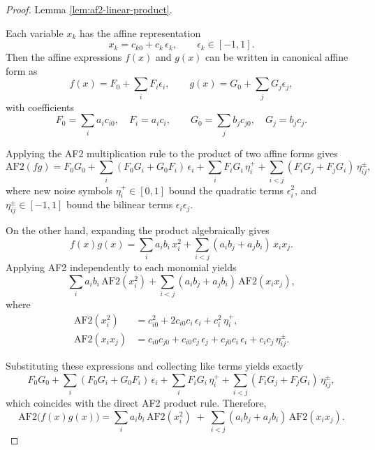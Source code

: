 \documentclass[10pt]{article}
\begin{document}
\begin{proof} Lemma \ref{lem:af2-linear-product}.

\noindent
Each variable \(x_k\) has the affine representation
\[
x_k = c_{k0} + c_k\,\epsilon_k, \qquad \epsilon_k \in [-1,1].
\]
Then the affine expressions \(f(x)\) and \(g(x)\) can be written in canonical affine form as
\[
f(x) = F_0 + \sum_i F_i \epsilon_i,
\qquad
g(x) = G_0 + \sum_j G_j \epsilon_j,
\]
with coefficients
\[
F_0 = \sum_i a_i c_{i0}, \quad F_i = a_i c_i,
\qquad
G_0 = \sum_j b_j c_{j0}, \quad G_j = b_j c_j.
\]

Applying the AF2 multiplication rule to the product of two affine forms gives
\[
\mathrm{AF2}(f g)
= F_0 G_0
+ \sum_i (F_0 G_i + G_0 F_i)\,\epsilon_i
+ \sum_i F_i G_i\,\eta_i^{+}
+ \sum_{i<j} (F_i G_j + F_j G_i)\,\eta_{ij}^{\pm},
\]
where new noise symbols \(\eta_i^{+} \in [0,1]\) bound the quadratic terms \(\epsilon_i^2\), 
and \(\eta_{ij}^{\pm} \in [-1,1]\) bound the bilinear terms \(\epsilon_i \epsilon_j\).

On the other hand, expanding the product algebraically gives
\[
f(x)g(x)
= \sum_i a_i b_i\,x_i^2
+ \sum_{i<j} (a_i b_j + a_j b_i)\,x_i x_j.
\]
Applying AF2 independently to each monomial yields
\[
\sum_i a_i b_i\,\mathrm{AF2}(x_i^2)
+ \sum_{i<j} (a_i b_j + a_j b_i)\,\mathrm{AF2}(x_i x_j),
\]
where
\begin{align*}
\mathrm{AF2}(x_i^2)
&= c_{i0}^2 + 2 c_{i0} c_i\,\epsilon_i + c_i^2\,\eta_i^{+}, \\
\mathrm{AF2}(x_i x_j)
&= c_{i0} c_{j0} + c_{i0} c_j\,\epsilon_j + c_{j0} c_i\,\epsilon_i + c_i c_j\,\eta_{ij}^{\pm}.
\end{align*}

Substituting these expressions and collecting like terms yields exactly
\[
F_0 G_0
+ \sum_i (F_0 G_i + G_0 F_i)\,\epsilon_i
+ \sum_i F_i G_i\,\eta_i^{+}
+ \sum_{i<j} (F_i G_j + F_j G_i)\,\eta_{ij}^{\pm},
\]
which coincides with the direct AF2 product rule. Therefore,
\[
\boxed{
\mathrm{AF2}\big(f(x)g(x)\big)
=
\sum_i a_i b_i\,\mathrm{AF2}(x_i^2)
\;+\;
\sum_{i<j}(a_i b_j + a_j b_i)\,\mathrm{AF2}(x_i x_j).
}
\]
\end{proof}
\end{document}
